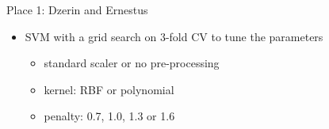 \documentclass[t]{beamer}
\begin{document}
\begin{frame}[c]{Place 1: Dzerin and Ernestus}

\begin{itemize}
  \item SVM with a grid search on 3-fold CV to tune the parameters
  \begin{itemize}
  	\item standard scaler or no pre-processing
  	\item kernel: RBF or polynomial
  	\item penalty: 0.7, 1.0, 1.3 or 1.6
  \end{itemize}
\end{itemize}


\end{frame}
\end{document}
